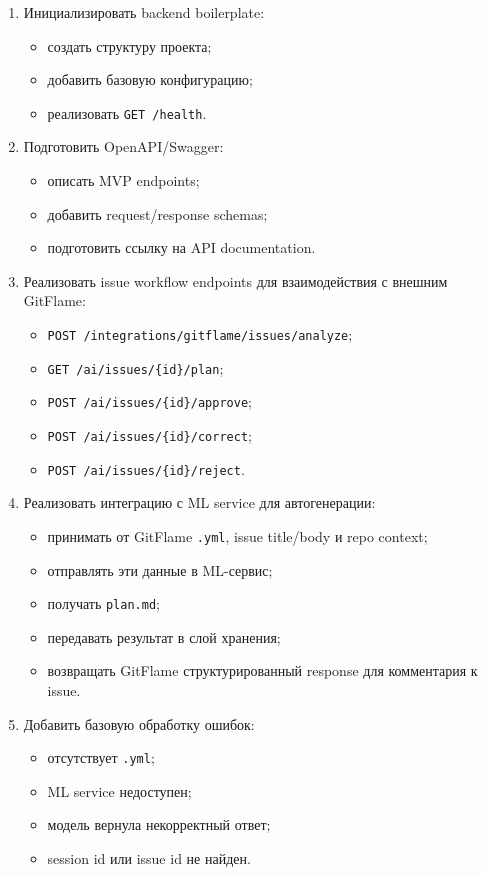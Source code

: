 \documentclass[12pt,a4paper]{article}
\begin{document}
\begin{enumerate}
    \item Инициализировать backend boilerplate:
    \begin{itemize}
        \item создать структуру проекта;
        \item добавить базовую конфигурацию;
        \item реализовать \texttt{GET /health}.
    \end{itemize}

    \item Подготовить OpenAPI/Swagger:
    \begin{itemize}
        \item описать MVP endpoints;
        \item добавить request/response schemas;
        \item подготовить ссылку на API documentation.
    \end{itemize}

    \item Реализовать issue workflow endpoints для взаимодействия с внешним GitFlame:
    \begin{itemize}
        \item \texttt{POST /integrations/gitflame/issues/analyze};
        \item \texttt{GET /ai/issues/\{id\}/plan};
        \item \texttt{POST /ai/issues/\{id\}/approve};
        \item \texttt{POST /ai/issues/\{id\}/correct};
        \item \texttt{POST /ai/issues/\{id\}/reject}.
    \end{itemize}

    \item Реализовать интеграцию с ML service для автогенерации:
    \begin{itemize}
        \item принимать от GitFlame \texttt{.yml}, issue title/body и repo context;
        \item отправлять эти данные в ML-сервис;
        \item получать \texttt{plan.md};
        \item передавать результат в слой хранения;
        \item возвращать GitFlame структурированный response для комментария к issue.
    \end{itemize}

    \item Добавить базовую обработку ошибок:
    \begin{itemize}
        \item отсутствует \texttt{.yml};
        \item ML service недоступен;
        \item модель вернула некорректный ответ;
        \item session id или issue id не найден.
    \end{itemize}
\end{enumerate}
\end{document}
